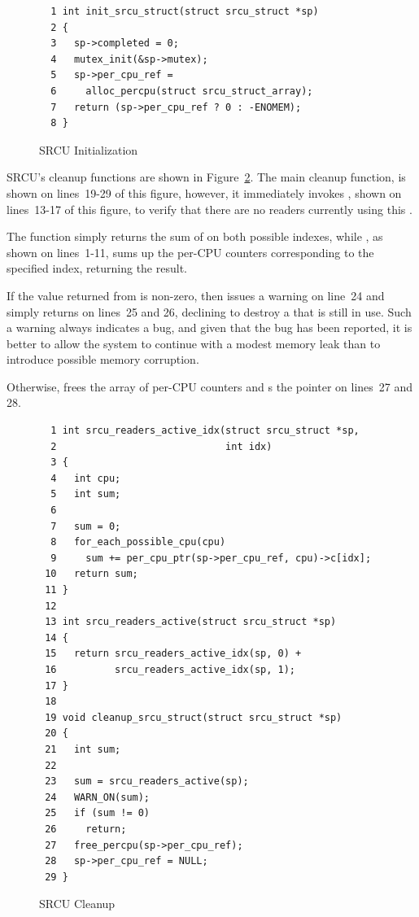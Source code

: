\begin{figure}[htbp]
{ \scriptsize
\begin{verbatim}
  1 int init_srcu_struct(struct srcu_struct *sp)
  2 {
  3   sp->completed = 0;
  4   mutex_init(&sp->mutex);
  5   sp->per_cpu_ref =
  6     alloc_percpu(struct srcu_struct_array);
  7   return (sp->per_cpu_ref ? 0 : -ENOMEM);
  8 }
\end{verbatim}
}
\caption{SRCU Initialization}
\label{fig:app:rcuimpl:SRCU Initialization}
\end{figure}

SRCU's cleanup functions are shown in
Figure~\ref{fig:app:rcuimpl:SRCU Cleanup}.
The main cleanup function,  is shown
on lines~19-29 of this figure, however, it immediately invokes
, shown on lines~13-17 of this figure,
to verify that there are no readers currently using this
 .

The  function simply returns the sum of
 on both possible indexes,
while , as shown on lines~1-11,
sums up the per-CPU counters corresponding to the specified index,
returning the result.

If the value returned from  is non-zero,
then  issues a warning on line~24 and
simply returns on lines~25 and 26, declining to destroy a
  that is still in use.
Such a warning always indicates a bug, and given that the bug
has been reported, it is better to allow the system to continue
with a modest memory leak than to introduce possible memory corruption.

Otherwise,  frees the array of per-CPU
counters and s the pointer on lines~27 and 28.

\begin{figure}[htbp]
{ \scriptsize
\begin{verbatim}
  1 int srcu_readers_active_idx(struct srcu_struct *sp,
  2                             int idx)
  3 {
  4   int cpu;
  5   int sum;
  6
  7   sum = 0;
  8   for_each_possible_cpu(cpu)
  9     sum += per_cpu_ptr(sp->per_cpu_ref, cpu)->c[idx];
 10   return sum;
 11 }
 12
 13 int srcu_readers_active(struct srcu_struct *sp)
 14 {
 15   return srcu_readers_active_idx(sp, 0) +
 16          srcu_readers_active_idx(sp, 1);
 17 }
 18
 19 void cleanup_srcu_struct(struct srcu_struct *sp)
 20 {
 21   int sum;
 22
 23   sum = srcu_readers_active(sp);
 24   WARN_ON(sum);
 25   if (sum != 0)
 26     return;
 27   free_percpu(sp->per_cpu_ref);
 28   sp->per_cpu_ref = NULL;
 29 }
\end{verbatim}
}
\caption{SRCU Cleanup}
\label{fig:app:rcuimpl:SRCU Cleanup}
\end{figure}

